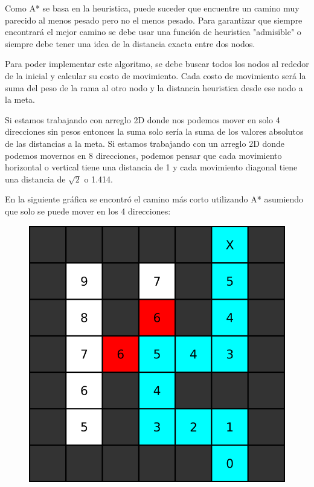 \documentclass{article}
\begin{document}
Como A* se basa en la heuristica, puede suceder que encuentre un camino muy parecido al menos pesado pero no el menos pesado. Para garantizar que siempre encontrará el mejor camino se debe usar una función de heuristica "admisible" o siempre debe tener una idea de la distancia exacta entre dos nodos.

Para poder implementar este algoritmo, se debe buscar todos los nodos al rededor de la inicial y calcular su costo de movimiento. Cada costo de movimiento será la suma del peso de la rama al otro nodo y la distancia heuristica desde ese nodo a la meta.

Si estamos trabajando con arreglo 2D donde nos podemos mover en solo 4 direcciones sin pesos entonces la suma solo sería la suma de los valores absolutos de las distancias a la meta. Si estamos trabajando con un arreglo 2D donde podemos movernos en 8 direcciones, podemos pensar que cada movimiento horizontal o vertical tiene una distancia de 1 y cada movimiento diagonal tiene una distancia de $\sqrt{2}$ o 1.414.

En la siguiente gráfica se encontró el camino más corto utilizando A* asumiendo que solo se puede mover en los 4 direcciones:

\begin{figure}[H]
    \centering
    \includegraphics[width=0.32\paperwidth]{astrella}
\end{figure}
\end{document}
